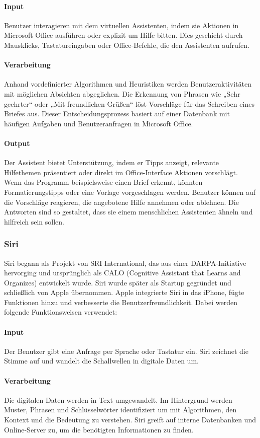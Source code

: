 \documentclass[conference]{IEEEtran}
\begin{document}
\paragraph{Input}Benutzer interagieren mit dem virtuellen Assistenten, indem sie Aktionen in Microsoft Office ausführen oder explizit um Hilfe bitten. Dies geschieht durch Mausklicks, Tastatureingaben oder Office-Befehle, die den Assistenten aufrufen.
\paragraph{Verarbeitung} Anhand vordefinierter Algorithmen und Heuristiken werden Benutzeraktivitäten mit möglichen Absichten abgeglichen. Die Erkennung von Phrasen wie „Sehr geehrter“ oder „Mit freundlichen Grüßen“ löst Vorschläge für das Schreiben eines Briefes aus. Dieser Entscheidungsprozess basiert auf einer Datenbank mit häufigen Aufgaben und Benutzeranfragen in Microsoft Office.
\paragraph{Output}Der Assistent bietet Unterstützung, indem er Tipps anzeigt, relevante Hilfethemen präsentiert oder direkt im Office-Interface Aktionen vorschlägt. Wenn das Programm beispielsweise einen Brief erkennt, könnten Formatierungstipps oder eine Vorlage vorgeschlagen werden. Benutzer können auf die Vorschläge reagieren, die angebotene Hilfe annehmen oder ablehnen. Die Antworten sind so gestaltet, dass sie einem menschlichen Assistenten ähneln und hilfreich sein sollen\cite{cain_life_2017}.
 
\subsubsection{Siri}
Siri begann als Projekt von SRI International, das aus einer DARPA-Initiative hervorging und ursprünglich als CALO (Cognitive Assistant that Learns and Organizes) entwickelt wurde. Siri wurde später als Startup gegründet und schließlich von Apple übernommen. Apple integrierte Siri in das iPhone, fügte Funktionen hinzu und verbesserte die Benutzerfreundlichkeit. Dabei werden folgende Funktionsweisen verwendet:
\paragraph{Input} Der Benutzer gibt eine Anfrage per Sprache oder Tastatur ein. Siri zeichnet die Stimme auf und wandelt die Schallwellen in digitale Daten um.
\paragraph{Verarbeitung} Die digitalen Daten werden in Text umgewandelt. Im Hintergrund werden Muster, Phrasen und Schlüsselwörter identifiziert um mit Algorithmen, den Kontext und die Bedeutung zu verstehen. Siri greift auf interne Datenbanken und Online-Server zu, um die benötigten Informationen zu finden. 
\end{document}
